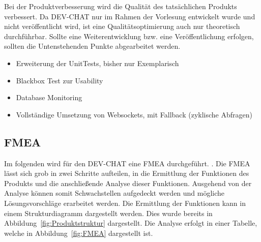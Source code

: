 \newparagraph
Bei der Produktverbesserung wird die Qualität des tatsächlichen Produkts verbessert.
Da DEV-CHAT nur im Rahmen der Vorlesung entwickelt wurde und nicht veröffentlicht wird, ist eine Qualitätsoptimierung auch nur theoretisch durchführbar. 
Sollte eine Weiterentwicklung bzw. eine Veröffentlichung erfolgen, sollten die Untenstehenden Punkte abgearbeitet werden.
\begin{itemize}
    \item Erweiterung der UnitTests, bisher nur Exemplarisch
    \item Blackbox Test zur Usability
    \item Database Monitoring
    \item Vollständige Umsetzung von Websockets, mit Fallback (zyklische Abfragen)
\end{itemize}

\subsection{\acl{FMEA}}
Im folgenden wird für den DEV-CHAT eine \ac{FMEA} durchgeführt.
 \autocite[][]{noauthor_fmea_nodate}.
\newparagraph
Die \ac{FMEA} lässt sich grob in zwei Schritte aufteilen, in die Ermittlung der Funktionen des Produkts und die anschließende Analyse dieser Funktionen.
Ausgehend von der Analyse können somit Schwachstellen aufgedeckt werden und mögliche Lösungsvorschläge erarbeitet werden.
Die Ermittlung der Funktionen kann in einem Strukturdiagramm dargestellt werden.
Dies wurde bereits in Abbildung~\ref{fig:Produktstruktur} dargestellt.
Die Analyse erfolgt in einer Tabelle, welche in Abbildung~\ref{fig:FMEA} dargestellt ist.





